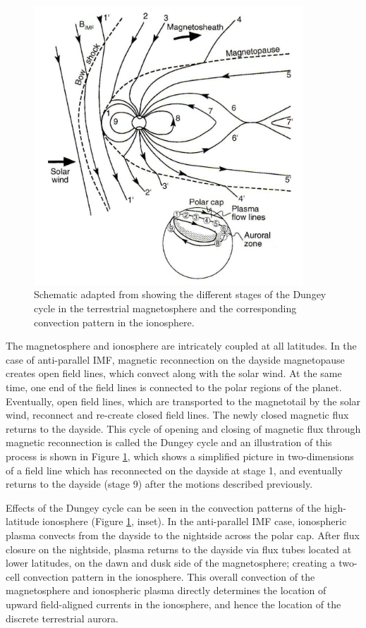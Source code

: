 \begin{figure}
    \centering
    \includegraphics[width=0.9\textwidth]{images1/dungey-cycle.png}
    \caption{Schematic adapted from \protect{} showing the different stages of the Dungey cycle in the terrestrial magnetosphere and the corresponding convection pattern in the ionosphere.}
    \label{fig:dungey-cycle}
\end{figure}

The magnetosphere and ionosphere are intricately coupled at all latitudes. In the case of anti-parallel IMF, magnetic reconnection on the dayside magnetopause creates open field lines, which convect along with the solar wind. At the same time, one end of the field lines is connected to the polar regions of the planet. Eventually, open field lines, which are transported to the magnetotail by the solar wind, reconnect and re-create closed field lines. The newly closed magnetic flux returns to the dayside. This cycle of opening and closing of magnetic flux through magnetic reconnection is called the Dungey cycle and an illustration of this process is shown in Figure \ref{fig:dungey-cycle}, which shows a simplified picture in two-dimensions of a field line which has reconnected on the dayside at stage 1, and eventually returns to the dayside (stage 9) after the motions described previously. 

Effects of the Dungey cycle can be seen in the convection patterns of the high-latitude ionosphere (Figure \ref{fig:dungey-cycle}, inset). In the anti-parallel IMF case, ionospheric plasma convects from the dayside to the nightside across the polar cap. After flux closure on the nightside, plasma returns to the dayside via flux tubes located at lower latitudes, on the dawn and dusk side of the magnetosphere; creating a two-cell convection pattern in the ionosphere. This overall convection of the magnetosphere and ionospheric plasma directly determines the location of upward field-aligned currents in the ionosphere, and hence the location of the discrete terrestrial aurora. 

